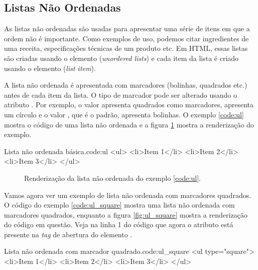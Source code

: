 \subsection{Listas Não Ordenadas}

As listas não ordenadas são usadas para apresentar uma série de itens em que a ordem não é importante. Como exemplos de uso, podemos citar ingredientes de uma receita, especificações técnicas de um produto etc. Em HTML, essas listas são criadas usando o elemento  (\textit{unordered lists}) e cada item da lista é criado usando o elemento  (\textit{list item}).

A lista não ordenada é apresentada com marcadores (bolinhas, quadrados etc.) antes de cada item da lista. O tipo de marcador pode ser alterado usando o atributo . Por exemplo, o valor  apresenta quadrados como marcadores,  apresenta um círculo e o valor , que é o padrão, apresenta bolinhas. O exemplo \ref{code:ul} mostra o código de uma lista não ordenada e a figura \ref{fig:ul} mostra a renderização do exemplo.

\begin{htmlcode}{Lista não ordenada básica.}{code:ul}
<ul>
    <li>Item 1</li>
    <li>Item 2</li>
    <li>Item 3</li>
</ul>
\end{htmlcode}

\begin{figure}[ht!]    
    \caption{Renderização da lista não ordenada do exemplo \ref{code:ul}.}
    \label{fig:ul}
\end{figure}

Vamos agora ver um exemplo de lista não ordenada com marcadores quadrados. O código do exemplo \ref{code:ul_square} mostra uma lista não ordenada com marcadores quadrados, enquanto a figura \ref{fig:ul_square} mostra a renderização do código em questão. Veja na linha 1 do código que agora o atributo  está presente na \textit{tag} de abertura do elemento .

\begin{htmlcode}{Lista não ordenada com marcador quadrado.}{code:ul_square}
<ul type="square">
    <li>Item 1</li>
    <li>Item 2</li>
    <li>Item 3</li>
</ul>
\end{htmlcode}


